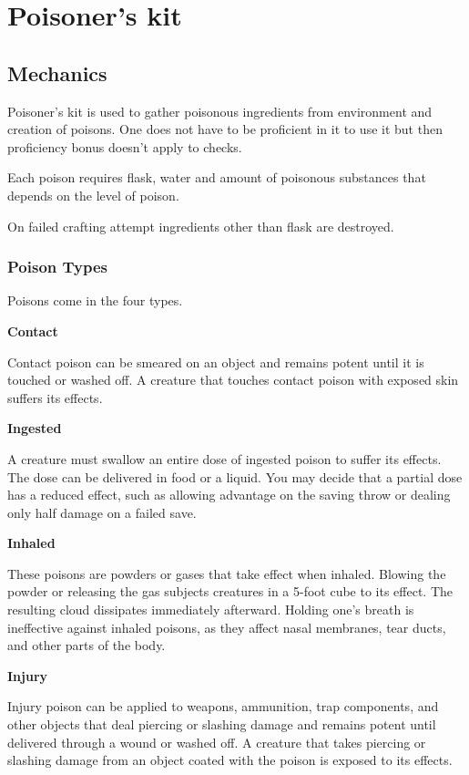 \chapter{Poisoner's kit}

\section{Mechanics}

Poisoner's kit is used to gather poisonous ingredients from environment and creation of poisons. One does not have to be proficient in it to use it but then proficiency bonus doesn't apply to checks.

Each poison requires flask, water and amount of poisonous substances that depends on the level of poison.

On failed crafting attempt ingredients other than flask are destroyed.

\subsection{Poison Types}

Poisons come in the four types.

\textbf{Contact}

Contact poison can be smeared on an object and remains potent until it is touched or washed off. A creature that touches contact poison with exposed skin suffers its effects.

\textbf{Ingested}

A creature must swallow an entire dose of ingested poison to suffer its effects. The dose can be delivered in food or a liquid. You may decide that a partial dose has a reduced effect, such as allowing advantage on the saving throw or dealing only half damage on a failed save.

\textbf{Inhaled}

These poisons are powders or gases that take effect when inhaled. Blowing the powder or releasing the gas subjects creatures in a 5-foot cube to its effect. The resulting cloud dissipates immediately afterward. Holding one's breath is ineffective against inhaled poisons, as they affect nasal membranes, tear ducts, and other parts of the body.

\textbf{Injury}

Injury poison can be applied to weapons, ammunition, trap components, and other objects that deal piercing or slashing damage and remains potent until delivered through a wound or washed off. A creature that takes piercing or slashing damage from an object coated with the poison is exposed to its effects.

